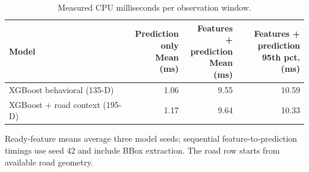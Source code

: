 \begin{table}[tbp]
\centering
\caption{Measured CPU milliseconds per observation window.}\label{tab:ch4_runtime}
\begin{tabularx}{\textwidth}{@{}Xrrr@{}}\toprule
\textbf{Model} & \shortstack{\textbf{Prediction}\\\textbf{only}\\\textbf{Mean (ms)}} & \shortstack{\textbf{Features +}\\\textbf{prediction}\\\textbf{Mean (ms)}} & \shortstack{\textbf{Features +}\\\textbf{prediction}\\\textbf{95th pct. (ms)}}\\[3pt]\midrule
XGBoost behavioral (135-D) & 1.06 & 9.55 & 10.59\\[3pt]
XGBoost + road context (195-D) & 1.17 & 9.64 & 10.33\\[3pt]
\bottomrule
\end{tabularx}
\smallskip
\begin{minipage}{\textwidth}\footnotesize
Ready-feature means average three model seeds; sequential feature-to-prediction timings
use seed 42 and include BBox extraction. The road row starts from available road geometry.
\end{minipage}
\end{table}
